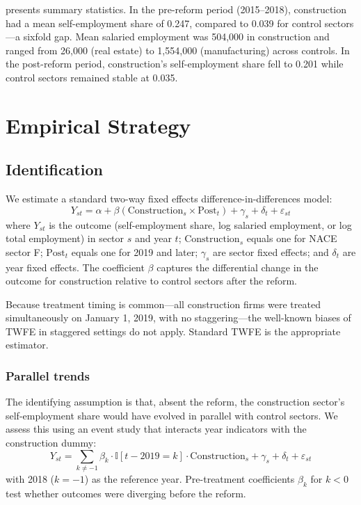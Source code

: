 \documentclass[12pt]{article}
\newcommand{\ind}{\mathbb{I}}
\begin{document}
 presents summary statistics. In the pre-reform period (2015--2018), construction had a mean self-employment share of 0.247, compared to 0.039 for control sectors---a sixfold gap. Mean salaried employment was 504,000 in construction and ranged from 26,000 (real estate) to 1,554,000 (manufacturing) across controls. In the post-reform period, construction's self-employment share fell to 0.201 while control sectors remained stable at 0.035.



\section{Empirical Strategy}
\label{sec:strategy}

\subsection{Identification}

We estimate a standard two-way fixed effects difference-in-differences model:
\begin{equation}
Y_{st} = \alpha + \beta (\text{Construction}_s \times \text{Post}_t) + \gamma_s + \delta_t + \varepsilon_{st}
\label{eq:did}
\end{equation}
where $Y_{st}$ is the outcome (self-employment share, log salaried employment, or log total employment) in sector $s$ and year $t$; $\text{Construction}_s$ equals one for NACE sector F; $\text{Post}_t$ equals one for 2019 and later; $\gamma_s$ are sector fixed effects; and $\delta_t$ are year fixed effects. The coefficient $\beta$ captures the differential change in the outcome for construction relative to control sectors after the reform.

Because treatment timing is common---all construction firms were treated simultaneously on January 1, 2019, with no staggering---the well-known biases of TWFE in staggered settings \citep{de2020difference, goodman2021difference, callaway2021difference} do not apply. Standard TWFE is the appropriate estimator.

\subsubsection*{Parallel trends} The identifying assumption is that, absent the reform, the construction sector's self-employment share would have evolved in parallel with control sectors. We assess this using an event study that interacts year indicators with the construction dummy:
\begin{equation}
Y_{st} = \sum_{k \neq -1} \beta_k \cdot \ind[t - 2019 = k] \cdot \text{Construction}_s + \gamma_s + \delta_t + \varepsilon_{st}
\label{eq:eventstudy}
\end{equation}
with 2018 ($k = -1$) as the reference year. Pre-treatment coefficients $\beta_k$ for $k < 0$ test whether outcomes were diverging before the reform.
\end{document}
